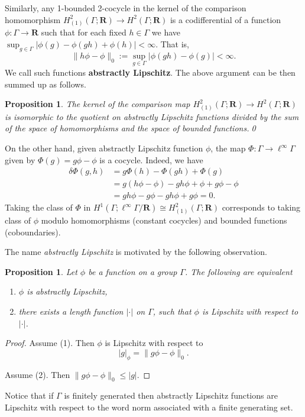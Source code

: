 \documentclass[12pt,reqno,a4paper]{amsart}
\renewcommand{\emph}[1]{{\bfseries\boldmath #1}}
\newtheorem{proposition}[subsection]{Proposition}
\theoremstyle{definition}
\theoremstyle{remark}
\numberwithin{equation}{section}
\numberwithin{figure}{section}
\newcommand{\B}[1]{{\mathbf #1}}
\begin{document}
Similarly, any 1-bounded 2-cocycle in the kernel of the comparison homomorphism
$H^2_{(1)}(\Gamma;\B R)\to H^2(\Gamma;\B R)$
is a codifferential of a function $\phi\colon\Gamma\to\B R$ such that
for each fixed $h\in\Gamma$ we have $\sup_{g\in\Gamma}|\phi(g)-\phi(gh)+\phi(h)|<\infty$. That is, 
$$
\|h\phi-\phi\|_0
:=\sup_{g\in\Gamma}|\phi(gh)-\phi(g)|<\infty.
$$  
We call such functions \emph{abstractly Lipschitz}.
The above argument can be then summed up as follows.
\begin{proposition}
The kernel of the comparison map $H^2_{(1)}(\Gamma;\B R)\to H^2(\Gamma;\B R)$
is isomorphic to the quotient on abstractly Lipschitz functions divided
by the sum of the space of homomorphisms and the space of bounded functions.\qed
\end{proposition}

On the other hand, given abstractly Lipschitz function $\phi$, the map
$\Phi\colon \Gamma \to \ell^{\infty}\Gamma$ given by $\Phi(g) = g\phi - \phi$
is a cocycle. Indeed, we have
\begin{align*}
\delta \Phi(g,h) &= g\Phi(h) - \Phi(gh) + \Phi(g)\\
&= g\left( h\phi-\phi \right) - gh\phi + \phi + g\phi -\phi\\
&= gh\phi - g\phi - gh\phi +g\phi = 0.
\end{align*}
Taking the class of $\Phi$ in $H^1(\Gamma;\ell^\infty\Gamma/\B R)\cong H^2_{(1)}(\Gamma;\B R)$ 
corresponds to taking class of $\phi$ modulo
homomorphisms (constant cocycles) and bounded functions (coboundaries).

The name {\itshape abstractly Lipschitz} is motivated by the following observation.

\begin{proposition}
Let $\phi$ be a function on a group $\Gamma$.  
The following are equivalent
\begin{enumerate}
\item $\phi$ is abstractly Lipschitz,
\item there exists a length function $|\cdot|$ on $\Gamma$, 
such that $\phi$ is Lipschitz with respect to $|\cdot|$.
\end{enumerate}
\end{proposition}

\begin{proof}
Assume (1). Then $\phi$ is Lipschitz with respect to
$$
|g|_\phi=\|g\phi-\phi\|_0.
$$

Assume (2).  Then $\|g\phi-\phi\|_0\leq |g|$.
\end{proof}
Notice that if $\Gamma$ is finitely generated then abstractly Lipschitz
functions are Lipschitz with respect to the word norm associated
with a finite generating set.
\end{document}
